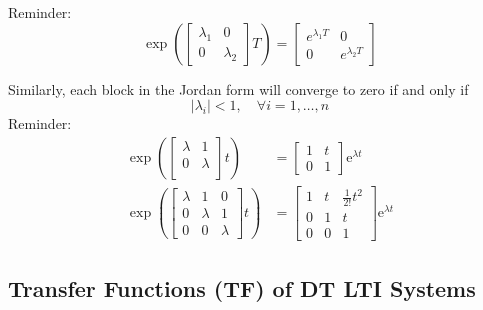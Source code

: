 Reminder:
\begin{equation*}
    \exp\left(
    \begin{bmatrix}
        \lambda_1 & 0         \\
        0         & \lambda_2
    \end{bmatrix}
    T\right) =
    \begin{bmatrix}
        e^{\lambda_{1}T} & 0                \\
        0                & e^{\lambda_{2}T}
    \end{bmatrix}
\end{equation*}


Similarly, each block in the Jordan form will converge to zero if and only if
\begin{equation*}
    |\lambda_i| <1,\quad\forall i=1,\ldots,n
\end{equation*}
Reminder:
\begin{align*}
    \left.\exp\left(
    \begin{bmatrix}\lambda & 1       \\
               0       & \lambda \\
        \end{bmatrix}\right.t\right)           & =
    \begin{bmatrix}1 & t \\
               0 & 1
    \end{bmatrix}
    \text{e}^{\lambda t}                       \\
    \left.\exp\left(
    \begin{bmatrix}\lambda & 1       & 0       \\
               0       & \lambda & 1       \\
               0       & 0       & \lambda
        \end{bmatrix}\right.t\right) & =
    \begin{bmatrix}1 & t & \frac{1}{2!}t^2 \\
               0 & 1 & t               \\
               0 & 0 & 1
    \end{bmatrix}
    \text{e}^{\lambda t}
\end{align*}

\subsection{Transfer Functions (TF) of DT LTI Systems}

